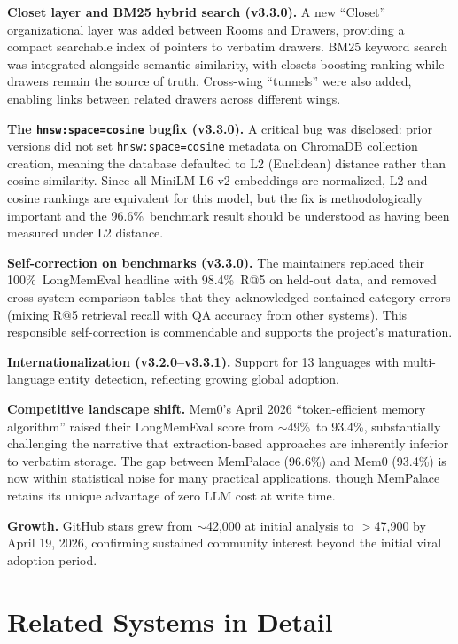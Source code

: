 \documentclass[twoside,11pt]{article}
\begin{document}
\textbf{Closet layer and BM25 hybrid search (v3.3.0).}  A new ``Closet''
organizational layer was added between Rooms and Drawers, providing a compact
searchable index of pointers to verbatim drawers.  BM25 keyword search was
integrated alongside semantic similarity, with closets boosting ranking while
drawers remain the source of truth.  Cross-wing ``tunnels'' were also added,
enabling links between related drawers across different wings.

\textbf{The \texttt{hnsw:space=cosine} bugfix (v3.3.0).}  A critical bug was
disclosed: prior versions did not set \texttt{hnsw:space=cosine} metadata on
ChromaDB collection creation, meaning the database defaulted to L2 (Euclidean)
distance rather than cosine similarity.  Since all-MiniLM-L6-v2 embeddings are
normalized, L2 and cosine rankings are equivalent for this model, but the fix
is methodologically important and the 96.6\%\ benchmark result should be
understood as having been measured under L2 distance.

\textbf{Self-correction on benchmarks (v3.3.0).}  The maintainers replaced
their 100\%\ LongMemEval headline with 98.4\%\ R@5 on held-out data, and
removed cross-system comparison tables that they acknowledged contained
category errors (mixing R@5 retrieval recall with QA accuracy from other
systems).  This responsible self-correction is commendable and supports the
project's maturation.

\textbf{Internationalization (v3.2.0--v3.3.1).}  Support for 13 languages
with multi-language entity detection, reflecting growing global adoption.

\textbf{Competitive landscape shift.}  Mem0's April 2026 ``token-efficient
memory algorithm'' raised their LongMemEval score from $\sim$49\%\ to 93.4\%,
substantially challenging the narrative that extraction-based approaches are
inherently inferior to verbatim storage.  The gap between MemPalace (96.6\%)
and Mem0 (93.4\%) is now within statistical noise for many practical
applications, though MemPalace retains its unique advantage of zero LLM cost
at write time.

\textbf{Growth.}  GitHub stars grew from $\sim$42{,}000 at initial analysis
to $>$47{,}900 by April 19, 2026, confirming sustained community interest
beyond the initial viral adoption period.

\section{Related Systems in Detail}
\label{sec:related}
\end{document}
